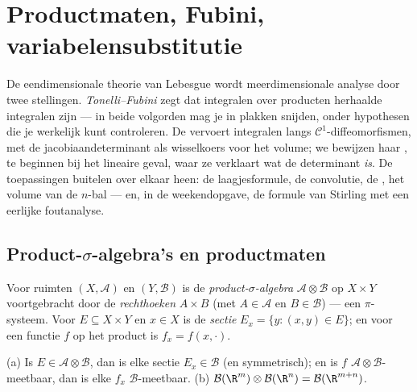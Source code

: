 \chapter{Productmaten, Fubini, variabelensubstitutie}
\label{ch:b3:product}

De eendimensionale theorie van Lebesgue wordt meerdimensionale
analyse door twee stellingen. \emph{Tonelli--Fubini} zegt dat
integralen over producten herhaalde integralen zijn --- in beide
volgorden mag je in plakken snijden, onder hypothesen die je
werkelijk kunt controleren. De \emph{} vervoert integralen langs
$\mathcal C^1$-diffeomorfismen, met de jacobiaandeterminant als
wisselkoers voor het volume; we bewijzen haar , te
beginnen bij het lineaire geval, waar ze verklaart wat de
determinant \emph{is}. De toepassingen buitelen over elkaar heen:
de laagjesformule, de convolutie, de , het volume
van de $n$-bal --- en, in de weekendopgave, de formule van
Stirling met een eerlijke foutanalyse.

\section{Product-$\sigma$-algebra's en productmaten}

\begin{definition}\label{def:b3:product:sigma}
Voor  ruimten $(X, \mathcal A)$ en $(Y, \mathcal B)$ is de
\emph{product-$\sigma$-algebra}
$\mathcal A \otimes \mathcal B$ op $X \times Y$ voortgebracht door
de \emph{rechthoeken} $A \times B$ (met $A \in \mathcal A$ en $B
\in \mathcal B$) --- een $\pi$-systeem. Voor $E \subseteq X\times
Y$ en $x \in X$ is de \emph{sectie} $E_x = \{y : (x,y) \in E\}$;
en voor een functie $f$ op het product is $f_x = f(x, \cdot)$.
\end{definition}

\begin{proposition}\label{prop:b3:product:sections}
(a) Is $E \in \mathcal A\otimes\mathcal B$, dan is elke sectie
$E_x \in \mathcal B$ (en symmetrisch); en is $f$ $\mathcal
A\otimes\mathcal B$-meetbaar, dan is elke $f_x$ $\mathcal
B$-meetbaar.
(b) $\mathcal B(\R^m)\otimes\mathcal B(\R^n) = \mathcal
B(\R^{m+n})$.
\end{proposition}


